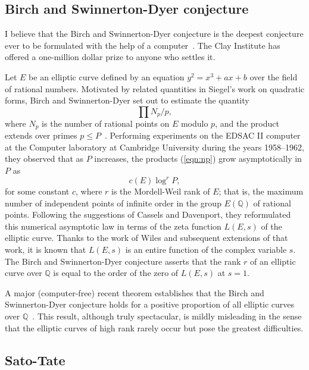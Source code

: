 \documentclass{llncs}
\newcommand{\ring}[1]{\mathbb{#1}}
\begin{document}
\subsection{Birch and Swinnerton-Dyer conjecture}

I believe that the Birch and Swinnerton-Dyer conjecture is the deepest
conjecture ever to be formulated with the help of a computer~\cite{BSD}.  The
Clay Institute has offered a one-million dollar prize to anyone who
settles it.

Let $E$  be an elliptic curve defined by
an equation $y^2 = x^3 + a x + b$ 
over the field of rational
numbers.  Motivated by related quantities in Siegel's work on quadratic forms, Birch and Swinnerton-Dyer set out to estimate the quantity
\begin{equation}\label{eqn:np}
\prod {N_p/p},
\end{equation}
where $N_p$ is the number of rational points on $E$ modulo $p$, and
the product extends over primes $p\le P$~\cite{Bir}.  Performing
experiments on the EDSAC II computer at the Computer laboratory at Cambridge University during the years 1958--1962, they observed that as $P$ increases, the products (\ref{eqn:np})
grow asymptotically in $P$ as 
\[
c(E) \log^r P,
\]
for some constant $c$, where $r$ is the Mordell-Weil rank of $E$; that
is, the maximum number of independent points of infinite order in the
group $E(\ring{Q})$ of rational points.  Following the suggestions of
Cassels and Davenport, they reformulated this numerical asymptotic law in
terms of the zeta function $L(E,s)$ of the elliptic curve.  Thanks to the work of Wiles
and subsequent extensions of that
work, it is known that $L(E,s)$ is an entire function of the complex
variable $s$.  The Birch and Swinnerton-Dyer conjecture asserts that
the rank $r$ of an elliptic curve over $\ring{Q}$ is equal to the
order of the zero of $L(E,s)$ at $s=1$.

A major (computer-free) recent theorem establishes that the Birch and Swinnerton-Dyer
conjecture holds for a positive proportion of all elliptic curves over
$\ring{Q}$~\cite{BS:2010}.  This result, although truly spectacular, is
mildly misleading in the sense that the elliptic curves of high rank rarely
occur but pose the greatest difficulties.





\subsection{Sato-Tate}
\end{document}
